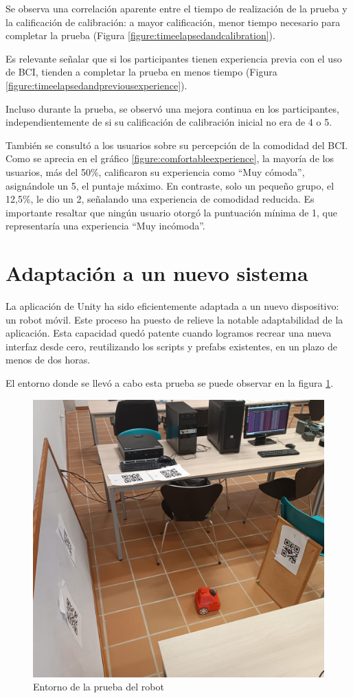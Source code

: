 Se observa una correlación aparente entre el tiempo de realización de la prueba y la calificación de calibración: a mayor calificación, menor tiempo necesario para completar la prueba (Figura \ref{figure:timeelapsedandcalibration}).



Es relevante señalar que si los participantes tienen experiencia previa con el uso de BCI, tienden a completar la prueba en menos tiempo (Figura \ref{figure:timeelapsedandpreviousexperience}).



Incluso durante la prueba, se observó una mejora continua en los participantes, independientemente de si su calificación de calibración inicial no era de 4 o 5.



También se consultó a los usuarios sobre su percepción de la comodidad del BCI. Como se aprecia en el gráfico \ref{figure:comfortableexperience}, la mayoría de los usuarios, más del 50\%, calificaron su experiencia como ``Muy cómoda'', asignándole un 5, el puntaje máximo. En contraste, solo un pequeño grupo, el 12,5\%, le dio un 2, señalando una experiencia de comodidad reducida. Es importante resaltar que ningún usuario otorgó la puntuación mínima de 1, que representaría una experiencia ``Muy incómoda''.

\section{Adaptación a un nuevo sistema}

La aplicación de Unity ha sido eficientemente adaptada a un nuevo dispositivo: un robot móvil. Este proceso ha puesto de relieve la notable adaptabilidad de la aplicación. Esta capacidad quedó patente cuando logramos recrear una nueva interfaz desde cero, reutilizando los scripts y prefabs existentes, en un plazo de menos de dos horas.



El entorno donde se llevó a cabo esta prueba se puede observar en la figura \ref{figure:entorno-prueba-robot}.

\begin{figure}[!htb]
   \centering
    \includegraphics[width=0.6\linewidth]{figures/entorno-prueba-robot.jpg}
   \caption{Entorno de la prueba del robot}
   \label{figure:entorno-prueba-robot}
\end{figure}


